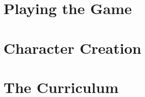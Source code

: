 

\part{Playing the Game}





\part{Character Creation}









\part{The Curriculum}















